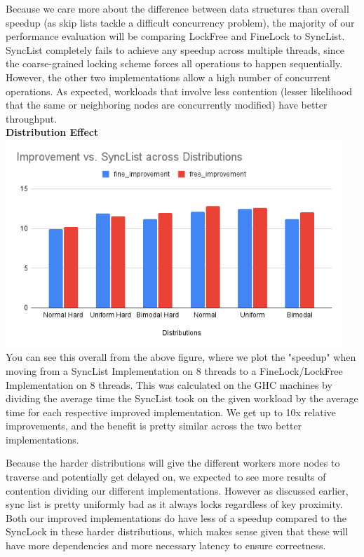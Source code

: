 \documentclass[11pt]{article}
\begin{document}
Because we care more about the difference between data structures than overall speedup (as skip lists tackle a difficult concurrency problem), the majority of our performance evaluation will be comparing LockFree and FineLock to SyncList. SyncList completely fails to achieve any speedup across multiple threads, since the coarse-grained locking scheme forces all operations to happen sequentially. However, the other two implementations allow a high number of concurrent operations. As expected, workloads that involve less contention (lesser likelihood that the same or neighboring nodes are concurrently modified) have better throughput. \\
\textbf{Distribution Effect} \\
\includegraphics[width=5in]{Improvement vs. SyncList across Distributions.png} \\
You can see this overall from the above figure, where we plot the "speedup" when moving from a SyncList Implementation on 8 threads to a FineLock/LockFree Implementation on 8 threads. This was calculated on the GHC machines by dividing the average time the SyncList took on the given workload by the average time for each respective improved implementation.
We get up to 10x relative improvements, and the benefit is pretty similar across the two better implementations. 

Because the harder distributions will give the different workers more nodes to traverse and potentially get delayed on, we expected to see more results of contention dividing our different implementations. However as discussed earlier, sync list is pretty uniformly bad as it always locks regardless of key proximity. Both our improved implementations do have less of a speedup compared to the SyncLock in these harder distributions, which makes sense given that these will have more dependencies and more necessary latency to ensure correctness.
\end{document}

